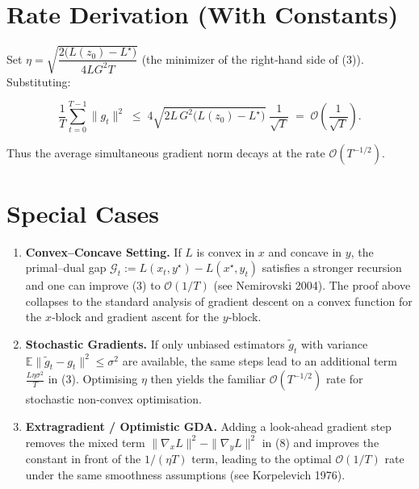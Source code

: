 \documentclass{article}
\begin{document}
\section*{Rate Derivation (With Constants)}
Set \(\eta = \sqrt{\dfrac{2\big(L(z_0)-L^{\star}\big)}{4L G^{2} T}}\) (the minimizer of the right‑hand side of (3)). Substituting:

\[
\frac{1}{T}\sum_{t=0}^{T-1}\|g_t\|^{2}
\;\le\;
4\sqrt{2L\,G^{2}\big(L(z_0)-L^{\star}\big)}\;\frac{1}{\sqrt{T}}
\;=\;
\mathcal{O}\!\left(\frac{1}{\sqrt{T}}\right).
\]

Thus the average simultaneous gradient norm decays at the rate \(\mathcal{O}(T^{-1/2})\).

\section*{Special Cases}
\begin{enumerate}[label=\alph*.]
\item \textbf{Convex–Concave Setting.} If \(L\) is convex in \(x\) and concave in \(y\), the primal–dual gap \(\mathcal{G}_t:=L(x_t,y^{\star})-L(x^{\star},y_t)\) satisfies a stronger recursion and one can improve (3) to \(\mathcal{O}(1/T)\) (see Nemirovski 2004). The proof above collapses to the standard analysis of gradient descent on a convex function for the \(x\)‑block and gradient ascent for the \(y\)‑block.
\item \textbf{Stochastic Gradients.} If only unbiased estimators \(\tilde g_t\) with variance \(\mathbb{E}\|\tilde g_t-g_t\|^{2}\le\sigma^{2}\) are available, the same steps lead to an additional term \(\frac{L\eta\sigma^{2}}{T}\) in (3). Optimising \(\eta\) then yields the familiar \(\mathcal{O}(T^{-1/2})\) rate for stochastic non‑convex optimisation.
\item \textbf{Extragradient / Optimistic GDA.} Adding a look‑ahead gradient step removes the mixed term \(\|\nabla_x L\|^{2}-\|\nabla_y L\|^{2}\) in (8) and improves the constant in front of the \(1/(\eta T)\) term, leading to the optimal \(\mathcal{O}(1/T)\) rate under the same smoothness assumptions (see Korpelevich 1976).
\end{enumerate}
\end{document}
